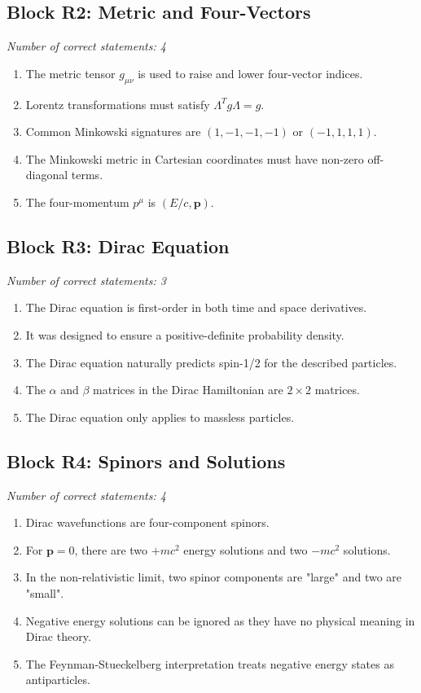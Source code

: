 \documentclass[a4paper,12pt]{article}
\begin{document}
\subsection*{Block R2: Metric and Four-Vectors}
\textit{Number of correct statements: 4}
\begin{enumerate}[label=\roman*.]
    \item The metric tensor $g_{\mu\nu}$ is used to raise and lower four-vector indices.
    \item Lorentz transformations must satisfy $\Lambda^T g \Lambda = g$.
    \item Common Minkowski signatures are $(1, -1, -1, -1)$ or $(-1, 1, 1, 1)$.
    \item The Minkowski metric in Cartesian coordinates must have non-zero off-diagonal terms.
    \item The four-momentum $p^\mu$ is $(E/c, \mathbf{p})$.
\end{enumerate}

\subsection*{Block R3: Dirac Equation}
\textit{Number of correct statements: 3}
\begin{enumerate}[label=\roman*.]
    \item The Dirac equation is first-order in both time and space derivatives.
    \item It was designed to ensure a positive-definite probability density.
    \item The Dirac equation naturally predicts spin-1/2 for the described particles.
    \item The $\alpha$ and $\beta$ matrices in the Dirac Hamiltonian are $2 \times 2$ matrices.
    \item The Dirac equation only applies to massless particles.
\end{enumerate}

\subsection*{Block R4: Spinors and Solutions}
\textit{Number of correct statements: 4}
\begin{enumerate}[label=\roman*.]
    \item Dirac wavefunctions are four-component spinors.
    \item For $\mathbf{p}=0$, there are two $+mc^2$ energy solutions and two $-mc^2$ solutions.
    \item In the non-relativistic limit, two spinor components are "large" and two are "small".
    \item Negative energy solutions can be ignored as they have no physical meaning in Dirac theory.
    \item The Feynman-Stueckelberg interpretation treats negative energy states as antiparticles.
\end{enumerate}
\end{document}
